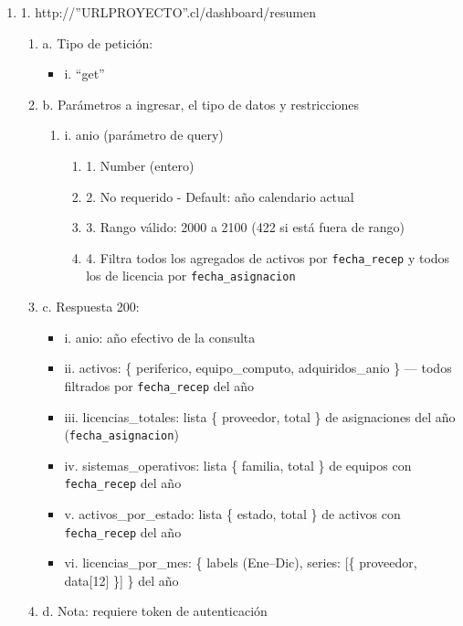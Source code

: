 \begin{enumerate}
    \item 1. http://”URLPROYECTO”.cl/dashboard/resumen
    \begin{enumerate}
        \item a. Tipo de petición:
            \begin{itemize}
               \item i. “get”
            \end{itemize}
        \item b. Parámetros a ingresar, el tipo de datos y restricciones
            \begin{enumerate}
                \item i. anio (parámetro de query)
                    \begin{enumerate}
                        \item 1. Number (entero)
                        \item 2. No requerido - Default: año calendario actual
                        \item 3. Rango válido: 2000 a 2100 (422 si está fuera de rango)
                        \item 4. Filtra todos los agregados de activos por \texttt{fecha\_recep} y todos los de licencia por \texttt{fecha\_asignacion}
                    \end{enumerate}
            \end{enumerate}
        \item c. Respuesta 200:
            \begin{itemize}
                \item i. anio: año efectivo de la consulta
                \item ii. activos: \{ periferico, equipo\_computo, adquiridos\_anio \} — todos filtrados por \texttt{fecha\_recep} del año
                \item iii. licencias\_totales: lista \{ proveedor, total \} de asignaciones del año (\texttt{fecha\_asignacion})
                \item iv. sistemas\_operativos: lista \{ familia, total \} de equipos con \texttt{fecha\_recep} del año
                \item v. activos\_por\_estado: lista \{ estado, total \} de activos con \texttt{fecha\_recep} del año
                \item vi. licencias\_por\_mes: \{ labels (Ene–Dic), series: [\{ proveedor, data[12] \}] \} del año
            \end{itemize}
        \item d. Nota: requiere token de autenticación
    \end{enumerate}
\end{enumerate}

